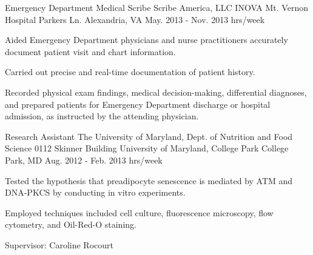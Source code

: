 \begin{cventries}

  \cventry
    {Emergency Department Medical Scribe} %
    {Scribe America, LLC } %
    {INOVA Mt. Vernon Hospital  Parkers Ln. \newline
Alexandria, VA
} %
    {May. 2013 - Nov. 2013   hrs/week} %
    {
      \begin{cvitems} %
        \item {Aided Emergency Department physicians and nurse practitioners accurately document patient visit and chart information.}
        \item{Carried out precise and real-time documentation of patient history.}
        \item{Recorded physical exam findings, medical decision-making, differential diagnoses, and prepared patients for Emergency Department discharge or hospital admission, as instructed by the attending physician.}
      \end{cvitems}
    }


  \cventry
    {Research Assistant} %
    {The University of Maryland, Dept. of Nutrition and Food Science} %
    {0112 Skinner Building \newline
University of Maryland, College Park \newline
College Park, MD} %
    {Aug. 2012 - Feb. 2013  hrs/week} %
    {
      \begin{cvitems} %
        \item {Tested the hypothesis that preadipocyte senescence is mediated by ATM and DNA-PKCS by conducting in vitro experiments.}
        \item{Employed techniques included cell culture, fluorescence microscopy, flow cytometry, and Oil-Red-O staining.}
         \item{Supervisor: Caroline Rocourt}
      \end{cvitems}
    }

\end{cventries}
